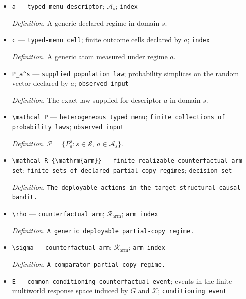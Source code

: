 \documentclass{article}
\begin{document}
\begin{itemize}
  \par\smallskip\noindent\emph{Definition.} The population laws supplied from domain \(s\).
  \item \texttt{a} --- \texttt{typed-\allowbreak{}menu descriptor}; \(\mathcal A_s\); \texttt{index}
  \par\smallskip\noindent\emph{Definition.} A generic declared regime in domain \(s\).
  \item \texttt{c} --- \texttt{typed-\allowbreak{}menu cell}; finite outcome cells declared by \(a\); \texttt{index}
  \par\smallskip\noindent\emph{Definition.} A generic atom measured under regime \(a\).
  \item \texttt{P\_\allowbreak{}a\textasciicircum{}s} --- \texttt{supplied population law}; probability simplices on the random vector declared by \(a\); \texttt{observed input}
  \par\smallskip\noindent\emph{Definition.} The exact law supplied for descriptor \(a\) in domain \(s\).
  \item \texttt{\textbackslash{}\allowbreak{}mathcal P} --- \texttt{heterogeneous typed menu}; \texttt{finite collections of probability laws}; \texttt{observed input}
  \par\smallskip\noindent\emph{Definition.} \(\mathcal P=\{P_a^s:s\in\mathcal S,\ a\in\mathcal A_s\}\).
  \item \texttt{\textbackslash{}\allowbreak{}mathcal R\_\allowbreak{}\{\textbackslash{}\allowbreak{}mathrm\{arm\}\allowbreak{}\}\allowbreak{}} --- \texttt{finite realizable counterfactual arm set}; \texttt{finite sets of declared partial-\allowbreak{}copy regimes}; \texttt{decision set}
  \par\smallskip\noindent\emph{Definition.} \texttt{The deployable actions in the target structural-\allowbreak{}causal bandit.}
  \item \texttt{\textbackslash{}\allowbreak{}rho} --- \texttt{counterfactual arm}; \(\mathcal R_{\mathrm{arm}}\); \texttt{arm index}
  \par\smallskip\noindent\emph{Definition.} \texttt{A generic deployable partial-\allowbreak{}copy regime.}
  \item \texttt{\textbackslash{}\allowbreak{}sigma} --- \texttt{counterfactual arm}; \(\mathcal R_{\mathrm{arm}}\); \texttt{arm index}
  \par\smallskip\noindent\emph{Definition.} \texttt{A comparator partial-\allowbreak{}copy regime.}
  \item \texttt{E} --- \texttt{common conditioning counterfactual event}; events in the finite multiworld response space induced by \(G\) and \(\mathcal X\); \texttt{conditioning event}

\end{itemize}
\end{document}

